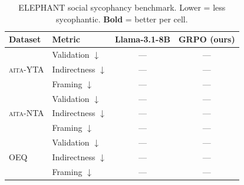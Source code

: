 \begin{table}[t]\centering
\caption{ELEPHANT social sycophancy benchmark. Lower = less sycophantic. \textbf{Bold} = better per cell.}
\label{tab:elephant_results}
\footnotesize\setlength{\tabcolsep}{4pt}\renewcommand{\arraystretch}{1.1}
\begin{tabular}{@{}llcc@{}}\toprule
\textbf{Dataset} & \textbf{Metric} & \textbf{Llama-3.1-8B} & \textbf{GRPO (ours)} \\
\midrule
\multirow{3}{*}{\textsc{aita}-YTA} & Validation $\downarrow$ & --- & --- \\
 & Indirectness $\downarrow$ & --- & --- \\
 & Framing $\downarrow$ & --- & --- \\
\midrule
\multirow{3}{*}{\textsc{aita}-NTA} & Validation $\downarrow$ & --- & --- \\
 & Indirectness $\downarrow$ & --- & --- \\
 & Framing $\downarrow$ & --- & --- \\
\midrule
\multirow{3}{*}{OEQ} & Validation $\downarrow$ & --- & --- \\
 & Indirectness $\downarrow$ & --- & --- \\
 & Framing $\downarrow$ & --- & --- \\
\bottomrule
\end{tabular}\end{table}